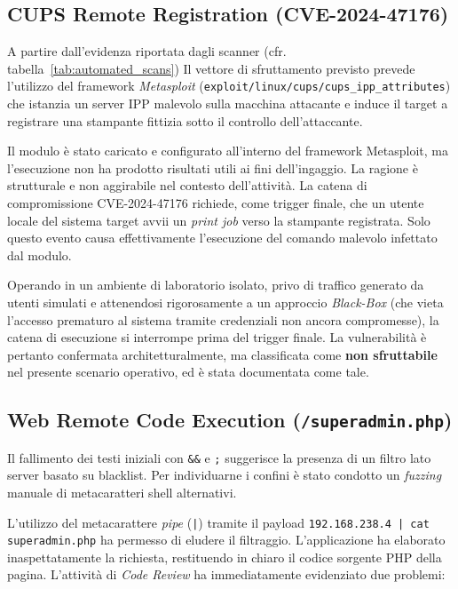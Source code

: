 \documentclass[11pt]{report}
\begin{document}
	\subsection{CUPS Remote Registration (CVE-2024-47176)}
	A partire dall'evidenza riportata dagli scanner (cfr. tabella~\ref{tab:automated_scans}) Il vettore di sfruttamento previsto prevede l'utilizzo del framework \textit{Metasploit} (\texttt{exploit/linux/cups/cups\_ipp\_attributes}) che istanzia un server IPP malevolo  sulla macchina attacante e induce il target a registrare una stampante fittizia sotto il controllo dell'attaccante.
	
	Il modulo è stato caricato e configurato all'interno del framework Metasploit, ma l'esecuzione non ha prodotto risultati utili ai fini dell'ingaggio. La ragione è strutturale e non aggirabile  nel contesto dell'attività.
	La catena di compromissione CVE-2024-47176 richiede, come trigger finale, che un utente locale del sistema target avvii un \textit{print job} verso la stampante registrata. Solo questo evento causa effettivamente l'esecuzione del comando malevolo infettato dal modulo.
	
	Operando in un ambiente di laboratorio isolato, privo di traffico generato da utenti simulati e attenendosi rigorosamente a un approccio \textit{Black-Box} (che vieta l'accesso prematuro al sistema tramite credenziali non ancora compromesse), la catena di esecuzione si interrompe prima del trigger finale. La vulnerabilità è pertanto confermata architetturalmente, ma classificata come \textbf{non sfruttabile} nel presente scenario operativo, ed è stata documentata come tale.
	
	\subsection{Web Remote Code Execution (\texttt{/superadmin.php})}
	Il fallimento dei testi iniziali con \texttt{\&\&} e \texttt{;} suggerisce la presenza di un filtro lato server basato su blacklist. Per individuarne i confini è stato condotto un  \textit{fuzzing} manuale di metacaratteri shell alternativi.
	
	L'utilizzo del metacarattere \textit{pipe} (\texttt{|}) tramite il payload \texttt{192.168.238.4 | cat superadmin.php} ha permesso di eludere il filtraggio. L'applicazione ha elaborato inaspettatamente la richiesta, restituendo in chiaro il codice sorgente PHP della pagina. L'attività di \textit{Code Review} ha immediatamente evidenziato due problemi:
	
\end{document}

